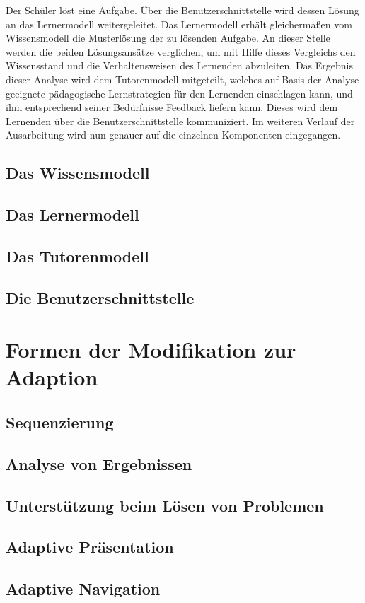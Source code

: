Der Schüler löst eine Aufgabe. Über die Benutzerschnittstelle wird dessen Lösung
an das Lernermodell weitergeleitet. Das Lernermodell erhält gleichermaßen vom Wissensmodell
die Musterlösung der zu lösenden Aufgabe. An dieser Stelle werden die beiden Lösungsansätze
verglichen, um mit Hilfe dieses Vergleichs den Wissensstand und die Verhaltensweisen
des Lernenden abzuleiten. Das Ergebnis dieser Analyse wird dem Tutorenmodell mitgeteilt, welches
auf Basis der Analyse geeignete pädagogische Lernstrategien für den Lernenden einschlagen kann,
und ihm entsprechend seiner Bedürfnisse Feedback liefern kann. Dieses wird dem Lernenden
über die Benutzerschnittstelle kommuniziert. Im weiteren Verlauf der Ausarbeitung
wird nun genauer auf die einzelnen Komponenten eingegangen.

\subsection{Das Wissensmodell}

\subsection{Das Lernermodell}

\subsection{Das Tutorenmodell}

\subsection{Die Benutzerschnittstelle}

\section{Formen der Modifikation zur Adaption}

\subsection{Sequenzierung}

\subsection{Analyse von Ergebnissen}

\subsection{Unterstützung beim Lösen von Problemen}

\subsection{Adaptive Präsentation}

\subsection{Adaptive Navigation}
